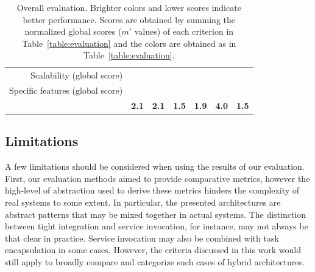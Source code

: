 \documentclass[preprint,3p,twocolumn]{elsarticle}
\newcommand{\note}[2]{\pdfmargincomment[color=yellow,author=#1,open=true]{#2}}
\newcommand{\closednote}[4]{} %
\begin{document}
\begin{table}
\begin{tabular}{rcccccc}
Scalability (global score)  & \cellcolor[HTML]{999999}{1.00}
                                     & \cellcolor[HTML]{99CC99}{0.50}
                                     & \cellcolor[HTML]{99CC99}{0.50}
                                     & \cellcolor[HTML]{99FF99}{0.00}
                                     & \cellcolor[HTML]{99CC99}{0.50}
                                     & \cellcolor[HTML]{99CC99}{0.50}\\
Specific features (global score) & \cellcolor[HTML]{99CC99}{0.50}
                                     & \cellcolor[HTML]{99CC99}{0.50}
                                     & \cellcolor[HTML]{999999}{1.00}
                                     & \cellcolor[HTML]{99CC99}{0.50}
                                     & \cellcolor[HTML]{99CC99}{0.50}
                                     & \cellcolor[HTML]{99FF99}{0.00}\\
                                    & \cellcolor[HTML]{99E799}\textbf{2.1}
                                    & \cellcolor[HTML]{99E699}\textbf{2.1}
                                    & \cellcolor[HTML]{99FE99}\textbf{1.5}
                                    & \cellcolor[HTML]{99EF99}\textbf{1.9}
                                    & \cellcolor[HTML]{999999}\textbf{4.0}
                                    & \cellcolor[HTML]{99FF99}\textbf{1.5}\\
\end{tabular}
\caption{Overall evaluation. Brighter colors and lower scores indicate better performance. Scores
  are obtained by summing the normalized global scores ($m'$ values) of
  each criterion in Table~\ref{table:evaluation} and the colors are obtained as in Table~\ref{table:evaluation}. }
\label{table:overall}
\end{table}

\subsection{Limitations}


A few limitations should be considered when using the results of our
evaluation. First, our evaluation methods aimed to provide comparative
metrics, however the high-level of abstraction used to derive these
metrics hinders the complexity of real systems to some
extent.\closednote{Naj}{Here, you were bashing your article harshly,
  so I rewrote it}{Tristan}{yup, thanks!} In particular, the
presented architectures are abstract patterns that may be mixed
together in actual systems.\closednote{Naj}{something about "theoretical
  pattern", and "blending" is jarring, are these common words in the
  computer sci context?}{Tristan}{Better now?} The distinction between tight integration and
service invocation, for instance, may not always be that clear in
practice. Service invocation may also be combined with task
encapsulation in some cases. However, the criteria discussed in this
work would still apply to broadly compare and categorize such cases of
hybrid architectures.
\end{document}

